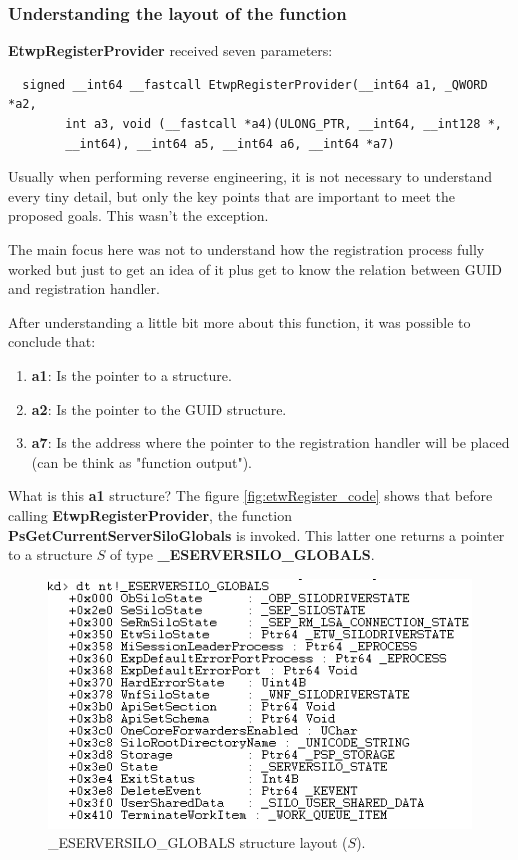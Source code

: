   \subsubsection{Understanding the layout of the function}
  {\bfseries EtwpRegisterProvider} received seven parameters:
  \begin{verbatim}
  signed __int64 __fastcall EtwpRegisterProvider(__int64 a1, _QWORD *a2,
        int a3, void (__fastcall *a4)(ULONG_PTR, __int64, __int128 *,
        __int64), __int64 a5, __int64 a6, __int64 *a7)
  \end{verbatim}

  Usually when performing reverse engineering, it is not necessary to understand every tiny detail, but only the key points that are important to meet the proposed goals. This wasn't the exception. 

  The main focus here was not to understand how the registration process fully worked but just to get an idea of it plus get to know the relation between GUID and registration handler.

  After understanding a little bit more about this function, it was possible to conclude that:
  \begin{enumerate}
  \item {\bfseries a1}: Is the pointer to a structure.
  \item {\bfseries a2}: Is the pointer to the GUID structure. 
  \item {\bfseries a7}: Is the address where the pointer to the registration handler will be placed (can be think as "function output").
  \end{enumerate}

  What is this {\bfseries a1} structure?
  The figure \ref{fig:etwRegister_code} shows that before calling {\bfseries EtwpRegisterProvider}, the function {\bfseries PsGetCurrentServerSiloGlobals} is invoked. This latter one returns a pointer to a structure $S$ of type {\bfseries \_ESERVERSILO\_GLOBALS}. 

  \begin{centering}
  \begin{figure}[H]
    \includegraphics[width=12cm]{images/ESILOGLOBALS_structure.png}
    \caption[]{\_ESERVERSILO\_GLOBALS structure layout ($S$).}
    \label{fig:eserversilo_globals_structure}
  \end{figure}
  \end{centering}

